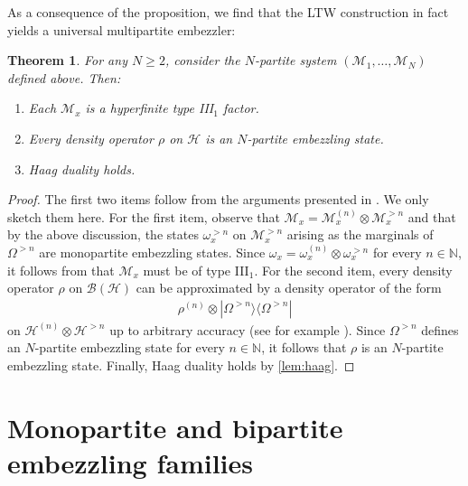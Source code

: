 \documentclass[a4paper, 10pt, onecolumn, accepted=2025-07-22]{quantumarticle}
\newtheorem{theorem}{Theorem}
\theoremstyle{definition}
\newcommand{\ox}{\otimes}
\newcommand{\mc}{\mathcal}
\newcommand{\up}[1]{^{(#1)}}
\def\B{{\mc B}}
\def\H{{\mc H}}
\def\M{{\mc M}}
\def\NN{{\mathbb N}}
\newcommand*{\1}{\text{\usefont{U}{bbold}{m}{n}1}}
\begin{document}
As a consequence of the proposition, we find that the LTW construction in fact yields a universal multipartite embezzler:
\begin{theorem}
    For any $N\geq 2$, consider the $N$-partite system $(\M_{1},\ldots,\M_{N})$ defined above.
    Then:
    \begin{enumerate}
        \item Each $\M_{x}$ is a hyperfinite type III$_1$ factor.
        \item Every density operator $\rho$ on $\H$ is an $N$-partite embezzling state. 
        \item Haag duality holds.
    \end{enumerate}
\end{theorem}

\begin{proof}
    The first two items follow from the arguments presented in \cite[Sec. 6]{long_paper}. We only sketch them here. For the first item, observe that  $\M_{x}=\M_{x}\up{n}\ox \M_{x}^{>n}$ and that by the above discussion, the states $\omega_x^{>n}$  on $\M_{x}^{>n}$ arising as the marginals of $\Omega^{>n}$ are monopartite embezzling states. Since $\omega_x = \omega_x\up{n}\ox \omega_x^{>n}$ for every $n\in\NN$, it follows from \cite[Thm.~88]{long_paper} that $\M_{x}$ must be of type III$_1$.
    For the second item, every density  operator $\rho$ on $\B(\H)$ can be approximated by a density operator of the form
    \begin{align}
        \rho\up{n} \otimes |\Omega^{>n}\rangle\langle \Omega^{>n}|
    \end{align}
    on $\H\up{n}\ox \H^{>n}$ up to arbitrary accuracy (see for example \cite[Cor. 85]{long_paper}).
    Since $\Omega^{>n}$ defines an $N$-partite embezzling state for every $n\in\NN$, it follows that $\rho$ is an $N$-partite embezzling state.
    Finally, Haag duality holds by \cref{lem:haag}.
\end{proof}



\section{Monopartite and bipartite embezzling families}
\label{sec:families}
\end{document}
